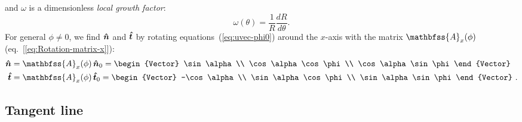 and \(\omega\) is a dimensionless \textit{local growth factor}:
\begin{equation}
  \label{eq:omega}
  \omega(\theta) = \frac{1}{R} \frac{dR}{d\theta} . 
\end{equation}
For general \(\phi \ne 0\), we find \(\bm{\hat{n}}\) and \(\bm{\hat{t}}\) by
rotating equations~(\ref{eq:uvec-phi0}) around the \(x\)-axis with the
matrix \(\mathbfss{A}_x(\phi)\) (eq.~[\ref{eq:Rotation-matrix-x}]):
\begin{align}
  \label{eq:uvec-n-phi}
  \uvec{n} &= \mathbfss{A}_x(\phi) \, \uvec{n}_0 =
  \begin{Vector}
    \sin\alpha \\ \cos\alpha\cos\phi \\ \cos\alpha\sin\phi
  \end{Vector}  \\
  \label{eq:uvec-t-phi}
  \uvec{t} &= \mathbfss{A}_x(\phi) \, \uvec{t}_0 =
  \begin{Vector}
    -\cos\alpha \\ \sin\alpha\cos\phi \\ \sin\alpha\sin\phi
  \end{Vector} \ .
\end{align}

\subsection{Tangent line}
\label{sec:tangent-line}

 


